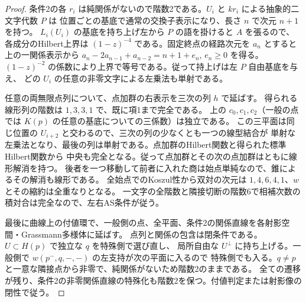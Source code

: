 \begin{proof}
条件2の各 $r_i$ は純関係がないので階数2である。$U_i$ と $kr_i$ による抽象的二文字代数 $P$ は
位置ごとの基底で通常の交換子表示になり、長さ $n$ で次元 $n+1$ を持つ。
$L_i(U_i)$ の基底を持ち上げ左から $P$ の語を掛けると $A$ を張るので、各成分のHilbert上界は
$(1-z)^{-4}$ である。固定終点の経路次元を $a_n$ とすると上の一関係表示から
$a_n-2a_{n-1}+a_{n-2}=n+1+e_n$, $e_n\ge0$ を得る。
$(1-z)^{-2}$ の係数により上界で等号である。従って持上げは左 $P$ 自由基底を与え、
どの $U_i$ の任意の非零文字による左乗法も単射である。

任意の両無限点列について、点加群の右表示を三次の列 $h$ で延ばす。
得られる線形列の階数は $1,3,3,1$ で、既に項1まで完全である。
上の $c_0,c_1,c_2$（一般の点では $K(p)$ の任意の基底についての三係数）は独立である。
この三平面は同じ位置の $U_{i+2}$ と交わるので、三次の列の少なくとも一つの線型結合が
単射な左乗法となり、最後の列は単射である。点加群のHilbert関数と得られた標準Hilbert関数から
中央も完全となる。従って点加群とその次の点加群はともに線形解消を持つ。
後者を一つ移動して前者に入れた商は始点単純なので、錐によるその解消も線形である。
全始点でのKoszul性から双対の次元は $1,4,6,4,1$、$w$ とその縮約は全重なりとなる。
一文字の全階数と隣接切断の階数6で相補次数の積対合は完全なので、左右AS条件が従う。

最後に曲線上の付値環で、一般側の点、全平面、条件2の関係直線を各射影空間・Grassmann多様体に延ばす。
点列と関係の包含は閉条件である。$U\subset H(p)$ で独立な $q$ を特殊側で選び直し、
局所自由な $U^\perp$ に持ち上げる。一般側で $w(p^-,q,-,-)$ の左支持が次の平面に入るので
特殊側でも入る。$q\ne p$ と一意な隣接点から非零で、純関係がないため階数2のままである。
全ての遷移が残り、条件2の非零関係直線の特殊化も階数2を保つ。付値判定または射影像の閉性で従う。
\end{proof}

